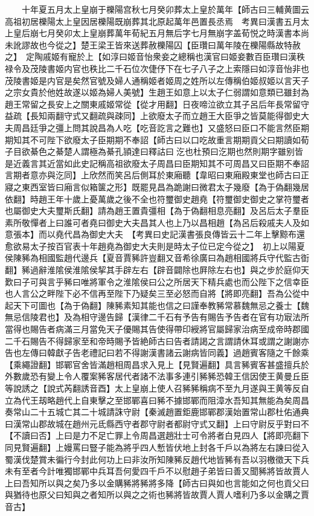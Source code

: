 　　十年夏五月太上皇崩于櫟陽宫秋七月癸卯葬太上皇於萬年【師古曰三輔黄圖云高祖初居櫟陽太上皇因居櫟陽既崩葬其北原起萬年邑置長丞焉　考異曰漢書五月太上皇后崩七月癸卯太上皇崩葬萬年荀紀五月無后字七月無崩字盖荀悦之時漢書本尚未訛謬故也今從之】楚王梁王皆來送葬赦櫟陽囚【臣瓚曰萬年陵在櫟陽縣故特赦之】　定陶戚姬有寵於上【如淳曰姬音怡衆妾之總稱也漢官曰姬妾數百臣瓚曰漢秩禄令及茂陵書姬内官也秩比二千石位次倢伃下在七子八子之上索隱曰如淳音怡非也茂陵書姬是内官是矣然官號及婦人通稱姬者姬周之姓所以左傳稱伯姬叔姬以言天子之宗女貴於他姓故遂以姬為婦人美號】生趙王如意上以太子仁弱謂如意類已雖封為趙王常留之長安上之關東戚姬常從【從才用翻】日夜啼泣欲立其子呂后年長常留守益疏【長知兩翻守式又翻疏與疎同】上欲廢太子而立趙王大臣爭之皆莫能得御史大夫周昌廷爭之彊上問其說昌為人吃【吃音訖言之難也】又盛怒曰臣口不能言然臣期期知其不可陛下欲廢太子臣期期不奉詔【師古曰以口吃故重言期期貢父曰期讀如荀子目欲綦色之綦楚人謂極為綦孔頴達曰釋詁曰汔也杜預曰汔期也然則期字雖别皆是近義言其近當如此史記稱高祖欲廢太子周昌曰臣期知其不可周昌又曰臣期不奉詔言期者意亦與汔同】上欣然而笑呂后側耳於東廂聽【韋昭曰東廂殿東堂也師古曰正寢之東西室皆曰廂言似箱箧之形】既罷見昌為跪謝曰微君太子幾廢【為于偽翻幾居依翻】時趙王年十歲上憂萬歲之後不全也符璽御史趙堯【符璽御史御史之掌符璽者也屬御史大夫璽斯氏翻】請為趙王置貴彊相【為于偽翻相息亮翻】及呂后太子羣臣素所敬憚者上曰誰可者堯曰御史大夫昌其人也上乃以昌相趙【為呂后殺戚夫人及如意張本】而以堯代昌為御史大夫　【考異曰史記漢書張良傳皆云十二年上擊黥布還愈欲易太子按百官表十年趙堯為御史大夫則是時太子位已定今從之】　初上以陽夏侯陳豨為相國監趙代邊兵【夏音賈豨許豈翻又音希徐廣曰為趙相國將兵守代監古衘翻】豨過辭淮隂侯淮隂侯挈其手辟左右【辟音闢除也屛除左右也】與之步於庭仰天歎曰子可與言乎豨曰唯將軍令之淮隂侯曰公之所居天下精兵處也而公陛下之信幸臣也人言公之畔陛下必不信再至陛下乃疑矣三至必怒而自將【將即亮翻】吾為公從中起天下可圖也【為于偽翻】陳豨素知其能也信之曰謹奉教豨常慕魏無忌之養士【魏無忌信陵君也】及為相守邊告歸【漢律二千石有予告有賜告予告者在官有功㝡法所當得也賜告者病滿三月當免天子優賜其告使得帶印綬將官屬歸家治病至成帝時郡國二千石賜告不得歸家至和帝時賜予皆絶師古曰告者請謁之言謂請休耳或謂之謝謝亦告也左傳曰韓獻子告老禮記曰若不得謝漢書諸云謝病皆同義】過趙賓客隨之千餘乘【乘繩證翻】邯鄲官舍皆滿趙相周昌求入見上【見賢遍翻】具言豨賓客甚盛擅兵於外數歲恐有變上令人覆案豨客居代者諸不法事多連引豨豨恐韓王信因使王黄曼丘臣等說誘之【說式芮翻誘音酉】太上皇崩上使人召豨豨稱病不至九月遂與王黄等反自立為代王刼略趙代上自東擊之至邯鄲喜曰豨不據邯鄲而阻漳水吾知其無能為矣周昌奏常山二十五城亡其二十城請誅守尉【秦滅趙置鉅鹿邯鄲郡漢始置常山郡杜佑通典曰漢常山郡故城在趙州元氐縣西守者郡守尉者都尉守式又翻】上曰守尉反乎對曰不【不讀曰否】上曰是力不足亡罪上令周昌選趙壯士可令將者白見四人【將即亮翻下同見賢遍翻】上嫚罵曰豎子能為將乎四人慙皆伏地上封各千戶以為將左右諫曰從入蜀漢伐楚賞未徧行今封此何功上曰非汝所知陳豨反趙代地皆豨有吾以羽檄徵天下兵未有至者今計唯獨邯鄲中兵耳吾何愛四千戶不以慰趙子弟皆曰善又聞豨將皆故賈人上曰吾知所以與之矣乃多以金購豨將豨將多降【師古曰與如也言能如之何也貢父曰與猶待也原父曰知與之者知所以與之之術也豨將皆故賈人賈人嗜利乃多以金購之賈音古】

